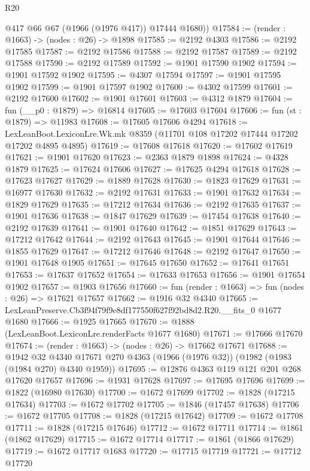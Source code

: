 \begin{lexlean}{R20}
\begin{coremodule}
        @417
        @66
        @67
        (@1966 (@1976 @417))
        @17444
        @1680))
@17584 := (render : @1663) -> (nodes : @26) -> @1898
@17585 := @2192 @4303
@17586 := @2192 @17585
@17587 := @2192 @17586
@17588 := @2192 @17587
@17589 := @2192 @17588
@17590 := @2192 @17589
@17592 := @1901 @17590 @1902
@17594 := @1901 @17592 @1902
@17595 := @4307 @17594
@17597 := @1901 @17595 @1902
@17599 := @1901 @17597 @1902
@17600 := @4302 @17599
@17601 := @2192 @17600
@17602 := @1901 @17601
@17603 := @4312 @1879
@17604 := fun (__p0 : @1879) => @16814
@17605 := @17603 @17604
@17606 := fun (st : @1879) => @11983
@17608 := @17605 @17606 @4294
@17618 := LexLeanBoot.LexiconLre.Wk.mk @8359 (@11701 @108 @17202 @17444 @17202 @17202 @4895 @4895)
@17619 := @17608 @17618
@17620 := @17602 @17619
@17621 := @1901 @17620
@17623 := @2363 @1879 @1898
@17624 := @4328 @1879
@17625 := @17624 @17606
@17627 := @17625 @4294 @17618
@17628 := @17623 @17627
@17629 := @1889 @17628
@17630 := @1823 @17629
@17631 := @16977 @17630
@17632 := @2192 @17631
@17633 := @1901 @17632
@17634 := @1829 @17629
@17635 := @17212 @17634
@17636 := @2192 @17635
@17637 := @1901 @17636
@17638 := @1847 @17629
@17639 := @17454 @17638
@17640 := @2192 @17639
@17641 := @1901 @17640
@17642 := @1851 @17629
@17643 := @17212 @17642
@17644 := @2192 @17643
@17645 := @1901 @17644
@17646 := @1855 @17629
@17647 := @17212 @17646
@17648 := @2192 @17647
@17650 := @1901 @17648 @1905
@17651 := @17645 @17650
@17652 := @17641 @17651
@17653 := @17637 @17652
@17654 := @17633 @17653
@17656 := @1901 @17654 @1902
@17657 := @1903 @17656
@17660 := fun (render : @1663) => fun (nodes : @26) => @17621 @17657
@17662 := @1916 @32 @4340
@17665 := LexLeanPreserve.Cb3f94f79f9e8df177550f627f92bd8d2.R20.__fits_0 @1677 @1680
@17666 := @1925 @17665
@17670 := @1888 (LexLeanBoot.LexiconLre.renderFacts @1677 @1680)
@17671 := @17666 @17670
@17674 := (render : @1663) -> (nodes : @26) -> @17662 @17671
@17688 := @1942
    @32
    @4340
    @17671
    @270
    @4363
    (@1966 (@1976 @32))
    (@1982 (@1983 (@1984 @270) @4340 @1959))
@17695 := @12876 @4363 @119 @121 @201 @268 @17620 @17657
@17696 := @1931 @17628
@17697 := @17695 @17696
@17699 := @1822 (@16980 @17630)
@17700 := @1672 @17699
@17702 := @1828 (@17215 @17634)
@17703 := @1672 @17702
@17705 := @1846 (@17457 @17638)
@17706 := @1672 @17705
@17708 := @1828 (@17215 @17642)
@17709 := @1672 @17708
@17711 := @1828 (@17215 @17646)
@17712 := @1672 @17711
@17714 := @1861 (@1862 @17629)
@17715 := @1672 @17714
@17717 := @1861 (@1866 @17629)
@17719 := @1672 @17717 @1683
@17720 := @17715 @17719
@17721 := @17712 @17720

\end{coremodule}
\end{lexlean}
